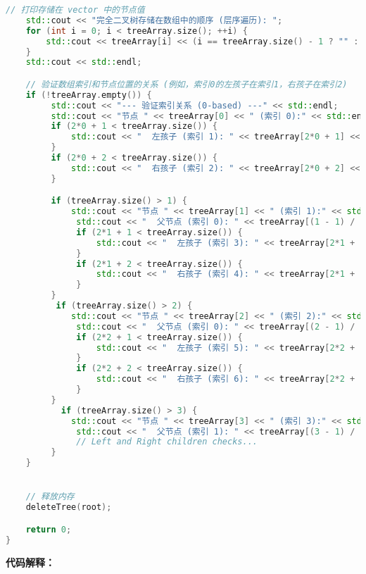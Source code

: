 \begin{lstlisting}[language=C++]
    // 打印存储在 vector 中的节点值
    std::cout << "完全二叉树存储在数组中的顺序 (层序遍历): ";
    for (int i = 0; i < treeArray.size(); ++i) {
        std::cout << treeArray[i] << (i == treeArray.size() - 1 ? "" : " ");
    }
    std::cout << std::endl;

    // 验证数组索引和节点位置的关系 (例如，索引0的左孩子在索引1，右孩子在索引2)
    if (!treeArray.empty()) {
         std::cout << "--- 验证索引关系 (0-based) ---" << std::endl;
         std::cout << "节点 " << treeArray[0] << " (索引 0):" << std::endl;
         if (2*0 + 1 < treeArray.size()) {
             std::cout << "  左孩子 (索引 1): " << treeArray[2*0 + 1] << std::endl;
         }
         if (2*0 + 2 < treeArray.size()) {
             std::cout << "  右孩子 (索引 2): " << treeArray[2*0 + 2] << std::endl;
         }

         if (treeArray.size() > 1) {
             std::cout << "节点 " << treeArray[1] << " (索引 1):" << std::endl;
              std::cout << "  父节点 (索引 0): " << treeArray[(1 - 1) / 2] << std::endl;
              if (2*1 + 1 < treeArray.size()) {
                  std::cout << "  左孩子 (索引 3): " << treeArray[2*1 + 1] << std::endl;
              }
              if (2*1 + 2 < treeArray.size()) {
                  std::cout << "  右孩子 (索引 4): " << treeArray[2*1 + 2] << std::endl;
              }
         }
          if (treeArray.size() > 2) {
             std::cout << "节点 " << treeArray[2] << " (索引 2):" << std::endl;
              std::cout << "  父节点 (索引 0): " << treeArray[(2 - 1) / 2] << std::endl;
              if (2*2 + 1 < treeArray.size()) {
                  std::cout << "  左孩子 (索引 5): " << treeArray[2*2 + 1] << std::endl;
              }
              if (2*2 + 2 < treeArray.size()) {
                  std::cout << "  右孩子 (索引 6): " << treeArray[2*2 + 2] << std::endl; // 这里会输出 6
              }
         }
           if (treeArray.size() > 3) {
             std::cout << "节点 " << treeArray[3] << " (索引 3):" << std::endl;
              std::cout << "  父节点 (索引 1): " << treeArray[(3 - 1) / 2] << std::endl;
              // Left and Right children checks...
         }
    }


    // 释放内存
    deleteTree(root);

    return 0;
}
\end{lstlisting}
\textbf{代码解释：}

